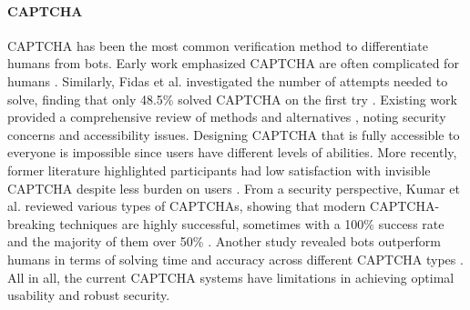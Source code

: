 \paragraph{CAPTCHA}
CAPTCHA \cite{von-Ahn2003-wr} has been the most common verification method to differentiate humans from bots. %
Early work %
emphasized CAPTCHA are often complicated for humans %
\cite{Bursztein2010-kf}. Similarly, Fidas et al. investigated the number of attempts needed to solve, finding that only 48.5\% solved CAPTCHA on the first try %
\cite{Fidas2011-ab}. %
Existing work provided a comprehensive review of methods and alternatives \cite{Moradi2015-is}, noting security concerns %
and accessibility issues. Designing CAPTCHA that is fully accessible to everyone is impossible since users have different levels of %
abilities. More recently, former literature %
highlighted participants had low satisfaction with invisible CAPTCHA despite less burden on users %
\cite{Tanthavech2019-dm}. 
From a security perspective, Kumar et al. reviewed various types of CAPTCHAs, showing that modern CAPTCHA-breaking techniques are highly successful, sometimes with a 100\% success rate and the majority of them over 50\% \cite{Kumar2022-uk}. %
Another study revealed bots outperform humans in terms of solving time and accuracy across different CAPTCHA types \cite{Searles2023-db}. All in all, the current CAPTCHA systems have limitations in achieving optimal usability and robust security.

